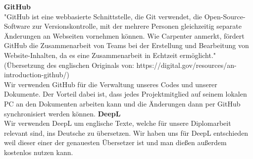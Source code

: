 \documentclass[]{article}
\begin{document}
\vspace{4mm}\newline
\textbf{GitHub} \\
"GitHub ist eine webbasierte Schnittstelle, die Git verwendet, die Open-Source-Software zur Versionskontrolle, mit der mehrere Personen gleichzeitig separate Änderungen an Webseiten vornehmen können. Wie Carpenter anmerkt, fördert GitHub die Zusammenarbeit von Teams bei der Erstellung und Bearbeitung von Website-Inhalten, da es eine Zusammenarbeit in Echtzeit ermöglicht." (Übersetzung des englischen Originals von: https://digital.gov/resources/an-introduction-github/) \\
Wir verwenden GitHub für die Verwaltung unseres Codes und unserer Dokumente. Der Vorteil dabei ist, dass jedes Projektmitglied auf seinem lokalen PC an den Dokumenten arbeiten kann und die Änderungen dann per GitHub synchronisiert werden können.
\vspace{4mm}\newline
\textbf{DeepL} \\
Wir verwenden DeepL um englische Texte, welche für unsere Diplomarbeit relevant sind, ins Deutsche zu übersetzen. Wir haben uns für DeepL entschieden weil dieser einer der genauesten Übersetzer ist und man dießen außerdem kostenlos nutzen kann.
\end{document}
